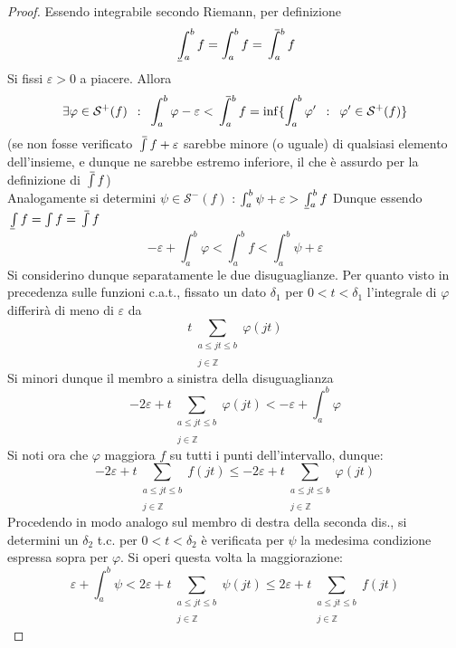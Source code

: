 \documentclass[10pt, oneside]{book}
\theoremstyle{plain}
\def\upint{\mathchoice%
    {\mkern13mu\overline{\vphantom{\intop}\mkern7mu}\mkern-20mu}%
    {\mkern7mu\overline{\vphantom{\intop}\mkern7mu}\mkern-14mu}%
    {\mkern7mu\overline{\vphantom{\intop}\mkern7mu}\mkern-14mu}%
    {\mkern7mu\overline{\vphantom{\intop}\mkern7mu}\mkern-14mu}%
  \int}
\def\lowint{\mkern3mu\underline{\vphantom{\intop}\mkern7mu}\mkern-10mu\int}
\begin{document}
\begin{proof}
    Essendo integrabile secondo Riemann, per definizione
    \[\lowint_a^b f = \int_a^b f = \upint_a^b f\]
    Si fissi $\varepsilon > 0$ a piacere. Allora 
    \[\exists \varphi \in \mathcal{S}^+(f) \enspace : \enspace \int_a^b \varphi - \varepsilon < \upint_a^b f = \inf\{\int_a^b \varphi' \enspace : \enspace \varphi' \in \mathcal{S}^+(f)\}\]
    (se non fosse verificato $\upint f + \varepsilon$ sarebbe minore (o uguale) di qualsiasi elemento dell'insieme, e dunque ne sarebbe estremo inferiore, il che è assurdo per la definizione di $\upint f$)
    \\Analogamente si determini $\psi \in \mathcal{S}^-(f)$ :  $\int_a^b \psi + \varepsilon > \lowint_a^b f$
    Dunque essendo $\lowint f = \int f = \upint f$
    \[- \varepsilon + \int_a^b \varphi < \int_a^b f < \int_a^b \psi + \varepsilon\]
    Si considerino dunque separatamente le due disuguaglianze. Per quanto visto in precedenza sulle funzioni c.a.t., fissato un dato $\delta_1$ per $0 < t < \delta_1$ l'integrale di $\varphi$ differirà di meno di $\varepsilon$ da 
    \[t \sum_{\substack{a \leq jt \leq b \\~\\ j \in \mathbb{Z}}} \varphi(jt)\]
    Si minori dunque il membro a sinistra della disuguaglianza
    \[- 2 \varepsilon + t \sum_{\substack{a \leq jt \leq b \\~\\ j \in \mathbb{Z}}} \varphi(jt) < -\varepsilon + \int_a^b \varphi\]
    Si noti ora che $\varphi$ maggiora $f$ su tutti i punti dell'intervallo, dunque:
    \[- 2 \varepsilon + t \sum_{\substack{a \leq jt \leq b \\~\\ j \in \mathbb{Z}}} f(jt) \leq - 2 \varepsilon + t \sum_{\substack{a \leq jt \leq b \\~\\ j \in \mathbb{Z}}} \varphi(jt)\]
    Procedendo in modo analogo sul membro di destra della seconda dis., si determini un $\delta_2$ t.c. per $0 < t < \delta_2$ è verificata per $\psi$ la medesima condizione espressa sopra per $\varphi$. Si operi questa volta la maggiorazione:
    \[\varepsilon + \int_a^b \psi < 2 \varepsilon + t \sum_{\substack{a \leq jt \leq b \\~\\ j \in \mathbb{Z}}} \psi(jt) \leq 2 \varepsilon + t \sum_{\substack{a \leq jt \leq b \\~\\ j \in \mathbb{Z}}} f(jt)\]

\end{proof}
\end{document}
